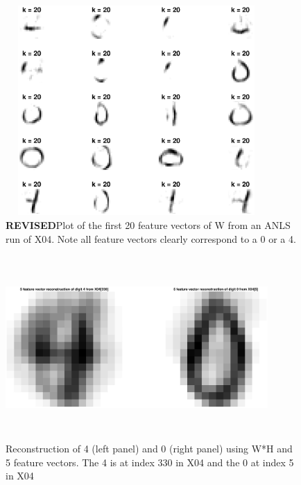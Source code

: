 \documentclass{article}
\begin{document}
\begin{figure}[H]
    \centerline
    {
    \includegraphics[width=10cm, height=8cm]{Q2_b_20FV}
    }
    \caption{\label{fig:my figure} \textbf{REVISED}Plot of the first 20 feature vectors of W from an ANLS run of X04.  Note all feature vectors clearly correspond to a 0 or a 4.}
\end{figure}

\begin{figure}[H]
    \centerline
    {
    \includegraphics[width=10cm, height=7cm]{Q2_b_reconstructed}
    }
    \caption{\label{fig:my figure}  Reconstruction of 4 (left panel) and 0 (right panel) using W*H and 5 feature vectors.  The 4 is at index 330 in X04 and the 0 at index 5 in X04}
\end{figure}
\end{document}
